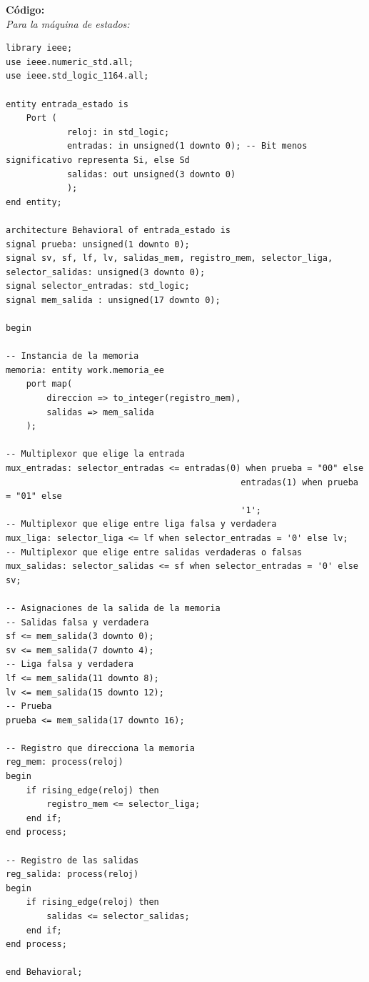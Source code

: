 \documentclass[12pt]{article}
\begin{document}
\textbf{C\'odigo:}\\

\textit{Para la m\'aquina de estados:}
\begin{lstlisting}
library ieee;
use ieee.numeric_std.all;
use ieee.std_logic_1164.all;

entity entrada_estado is
	Port (
			reloj: in std_logic;
			entradas: in unsigned(1 downto 0); -- Bit menos significativo representa Si, else Sd
			salidas: out unsigned(3 downto 0)
			);
end entity;

architecture Behavioral of entrada_estado is
signal prueba: unsigned(1 downto 0);
signal sv, sf, lf, lv, salidas_mem, registro_mem, selector_liga, selector_salidas: unsigned(3 downto 0);
signal selector_entradas: std_logic;
signal mem_salida : unsigned(17 downto 0);

begin

-- Instancia de la memoria
memoria: entity work.memoria_ee
	port map(
		direccion => to_integer(registro_mem),
		salidas => mem_salida
	);

-- Multiplexor que elige la entrada
mux_entradas: selector_entradas <= entradas(0) when prueba = "00" else
											  entradas(1) when prueba = "01" else
											  '1';
-- Multiplexor que elige entre liga falsa y verdadera
mux_liga: selector_liga <= lf when selector_entradas = '0' else lv;
-- Multiplexor que elige entre salidas verdaderas o falsas
mux_salidas: selector_salidas <= sf when selector_entradas = '0' else sv;

-- Asignaciones de la salida de la memoria
-- Salidas falsa y verdadera
sf <= mem_salida(3 downto 0);
sv <= mem_salida(7 downto 4);
-- Liga falsa y verdadera
lf <= mem_salida(11 downto 8);
lv <= mem_salida(15 downto 12);
-- Prueba
prueba <= mem_salida(17 downto 16);

-- Registro que direcciona la memoria
reg_mem: process(reloj)
begin
	if rising_edge(reloj) then
		registro_mem <= selector_liga;
	end if;
end process;

-- Registro de las salidas
reg_salida: process(reloj)
begin
	if rising_edge(reloj) then
		salidas <= selector_salidas;
	end if;
end process;

end Behavioral;
\end{lstlisting}
\end{document}
